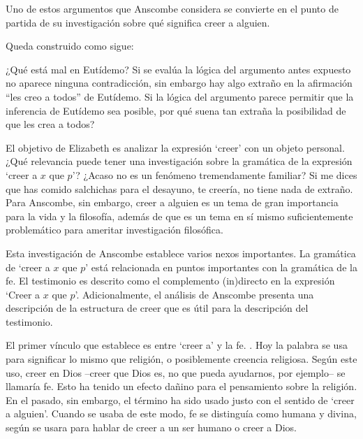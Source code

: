 Uno de estos argumentos que Anscombe considera se convierte en el
punto de partida de su investigación sobre qué significa creer a alguien.

Queda construido como
sigue: 

¿Qué está mal en Eutídemo? Si se evalúa la lógica del argumento antes expuesto
no aparece ninguna contradicción, sin embargo hay algo extraño en la afirmación
``les creo a todos'' de Eutídemo. Si la lógica del argumento parece permitir que
la inferencia de Eutídemo sea posible, por qué suena tan extraña la posibilidad
de que les crea a todos?

El objetivo de Elizabeth es analizar la expresión `creer' con un objeto
personal. ¿Qué relevancia puede tener una investigación sobre la gramática de la
expresión `creer a $x$ que $p$'? ¿Acaso no es un fenómeno tremendamente
familiar? Si me dices que has comido salchichas para el desayuno, te creería, no
tiene nada de extraño. Para Anscombe, sin embargo, creer a alguien es un tema de
gran importancia para la vida y la filosofía, además de que es un tema en sí
mismo suficientemente problemático para ameritar investigación filosófica.

Esta investigación de Anscombe establece varios nexos importantes. La gramática
de `creer a $x$ que $p$' está relacionada en puntos importantes con la gramática
de la fe. El testimonio es descrito como el complemento (in)directo en la
expresión `Creer a $x$ que $p$'. Adicionalmente, el análisis de Anscombe
presenta una descripción de la estructura de creer que es útil para la
descripción del testimonio.

El primer vínculo que establece es entre `creer a' y la fe. . Hoy la palabra se usa para significar lo mismo que religión, o
posiblemente creencia religiosa. Según este uso, creer en Dios --creer que Dios
es, no que pueda ayudarnos, por ejemplo-- se llamaría fe. Esto ha tenido un
efecto dañino para el pensamiento sobre la religión. En el pasado, sin embargo,
el término ha sido usado justo con el sentido de `creer a alguien'. Cuando se
usaba de este modo, fe se distinguía como humana y divina, según se usara para
hablar de creer a un ser humano o creer a Dios.

